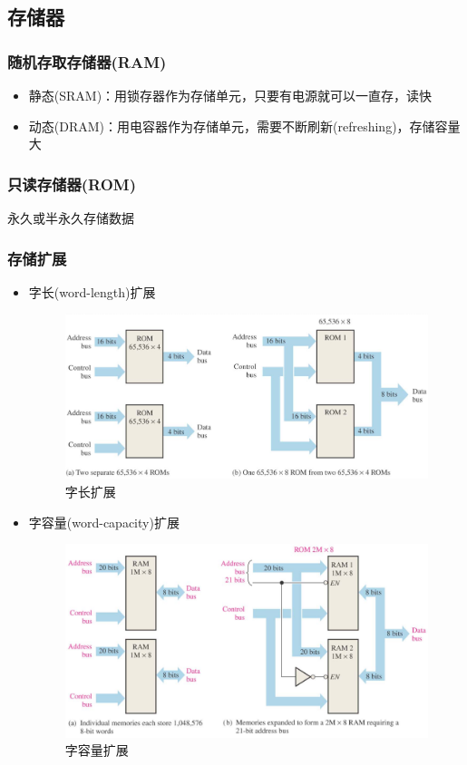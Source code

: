 \subsection{存储器}
\subsubsection{随机存取存储器(RAM)}
\begin{itemize}
	\item 静态(SRAM)：用锁存器作为存储单元，只要有电源就可以一直存，读快
	\item 动态(DRAM)：用电容器作为存储单元，需要不断刷新(refreshing)，存储容量大
\end{itemize}
\subsubsection{只读存储器(ROM)}
永久或半永久存储数据
\subsubsection{存储扩展}
\begin{itemize}
	\item 字长(word-length)扩展
\begin{figure}[htbp]
	\centering
	\includegraphics[width=0.6\linewidth]{fig/word-length.PNG}
	\caption{字长扩展}
\end{figure}
	\item 字容量(word-capacity)扩展
\begin{figure}[htbp]
	\centering
	\includegraphics[width=0.6\linewidth]{fig/word-capacity.PNG}
	\caption{字容量扩展}
\end{figure}
\end{itemize}

